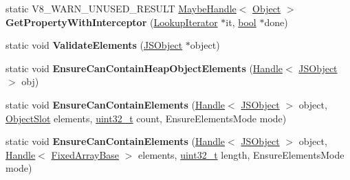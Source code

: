 \begin{DoxyCompactItemize}
\item 
\mbox{\label{classv8_1_1internal_1_1JSObject_a9c273ee11c01281f813ae34589bf33a9}} 
static V8\+\_\+\+W\+A\+R\+N\+\_\+\+U\+N\+U\+S\+E\+D\+\_\+\+R\+E\+S\+U\+LT \mbox{\hyperlink{classv8_1_1internal_1_1MaybeHandle}{Maybe\+Handle}}$<$ \mbox{\hyperlink{classv8_1_1internal_1_1Object}{Object}} $>$ {\bfseries Get\+Property\+With\+Interceptor} (\mbox{\hyperlink{classv8_1_1internal_1_1LookupIterator}{Lookup\+Iterator}} $\ast$it, \mbox{\hyperlink{classbool}{bool}} $\ast$done)
\item 
\mbox{\label{classv8_1_1internal_1_1JSObject_a88ea4331b596f30fb87883320b94b67c}} 
static void {\bfseries Validate\+Elements} (\mbox{\hyperlink{classv8_1_1internal_1_1JSObject}{J\+S\+Object}} $\ast$object)
\item 
\mbox{\label{classv8_1_1internal_1_1JSObject_a341090eaa5e24dd4bbecd049e44d72ef}} 
static void {\bfseries Ensure\+Can\+Contain\+Heap\+Object\+Elements} (\mbox{\hyperlink{classv8_1_1internal_1_1Handle}{Handle}}$<$ \mbox{\hyperlink{classv8_1_1internal_1_1JSObject}{J\+S\+Object}} $>$ obj)
\item 
\mbox{\label{classv8_1_1internal_1_1JSObject_a4c43159e750a3f795336df5c628fb9b0}} 
static void {\bfseries Ensure\+Can\+Contain\+Elements} (\mbox{\hyperlink{classv8_1_1internal_1_1Handle}{Handle}}$<$ \mbox{\hyperlink{classv8_1_1internal_1_1JSObject}{J\+S\+Object}} $>$ object, \mbox{\hyperlink{classv8_1_1internal_1_1ObjectSlot}{Object\+Slot}} elements, \mbox{\hyperlink{classuint32__t}{uint32\+\_\+t}} count, Ensure\+Elements\+Mode mode)
\item 
\mbox{\label{classv8_1_1internal_1_1JSObject_ab287ab1b3b49b1d237ba1a8598997148}} 
static void {\bfseries Ensure\+Can\+Contain\+Elements} (\mbox{\hyperlink{classv8_1_1internal_1_1Handle}{Handle}}$<$ \mbox{\hyperlink{classv8_1_1internal_1_1JSObject}{J\+S\+Object}} $>$ object, \mbox{\hyperlink{classv8_1_1internal_1_1Handle}{Handle}}$<$ \mbox{\hyperlink{classv8_1_1internal_1_1FixedArrayBase}{Fixed\+Array\+Base}} $>$ elements, \mbox{\hyperlink{classuint32__t}{uint32\+\_\+t}} length, Ensure\+Elements\+Mode mode)
\item 
\mbox{\label{classv8_1_1internal_1_1JSObject_a4cf79e36cdbb1e7fe97389ba3938bdf2}} 

\end{DoxyCompactItemize}
